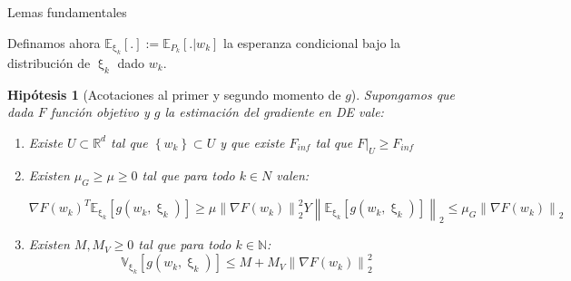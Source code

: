 \documentclass{beamer}
\newtheorem{hyp}[theorem]{Hip\'otesis}
\newcommand{\R}{{\mathbb{R}}}
\newcommand{\N}{{\mathbb{N}}}
\newcommand{\norm}[1]{\left\lVert#1\right\rVert}
\newcommand{\sett}[1]{\left\lbrace#1\right\rbrace}
\newcommand{\expectationsub}[2]{\mathbb{E}_{#1} \left[#2\right]}
\newcommand{\variancesub}[2]{\mathbb{V}_{#1} \left[#2\right]}
\newcommand{\expectationchik}[1]{\expectationsub{\upxi_{k}}{#1}}
\newcommand{\variancechik}[1]{\variancesub{\upxi_{k}}{#1}}
\begin{document}
\begin{frame}{Lemas fundamentales}

Definamos ahora $\expectationsub{\upxi_k}{.} := \mathbb{E}_{P_k}\left[. \vert w_k\right]$ la esperanza condicional bajo la distribuci\'on de $\upxi_k$ dado $w_k$.

\begin{hyp}[Acotaciones al primer y segundo momento de $g$]
	Supongamos que dada $F$ funci\'on objetivo y $g$ la estimaci\'on del gradiente en DE vale:
	
	\begin{enumerate}
		\item Existe $U \subset \R^d$ tal que $\sett{w_k} \subset U$ y que existe $F_{inf}$ tal que $F\vert_U \geq F_{inf}$
		\item Existen $\mu_G \geq \mu \geq 0$ tal que para todo $k \in N$ valen:
		
		\begin{subequations}
			\begin{equation*}
			\nabla F(w_k)^T \expectationchik{g(w_k, \upxi_{k})} \geq \mu \norm{\nabla F(w_k)}_2^2
			\end{equation*}
			Y
			\begin{equation*}
			\norm{\expectationchik{g(w_k, \upxi_{k})}}_2 \leq \mu_G \norm{\nabla F(w_k)}_2
			\end{equation*}
		\end{subequations}
		\item 	Existen $M, M_V \geq 0$ tal que para todo $k \in \N$:
		\begin{equation*}
		\variancechik{g(w_k, \upxi_{k})} \leq M + M_V \norm{\nabla F (w_k)}_2^2
		\end{equation*}
		
	\end{enumerate}
	
\end{hyp}

\end{frame}
\end{document}
